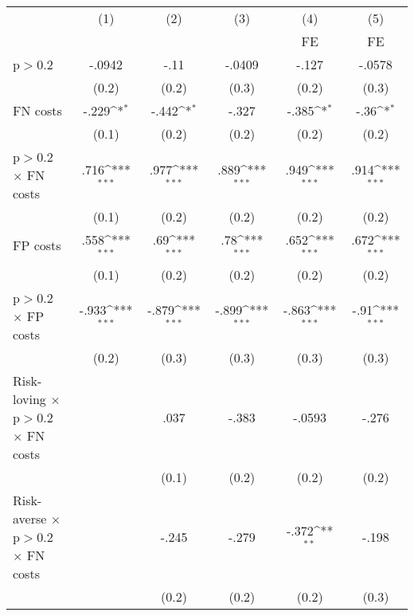 \def\sym#1{\ifmmode^{#1}\else\(^{#1}\)\fi}
\begin{tabular}{l*{5}{c}}
\hline\hline
                &\multicolumn{1}{c}{(1)}&\multicolumn{1}{c}{(2)}&\multicolumn{1}{c}{(3)}&\multicolumn{1}{c}{(4)}&\multicolumn{1}{c}{(5)}\\
                &\multicolumn{1}{c}{}&\multicolumn{1}{c}{}&\multicolumn{1}{c}{}&\multicolumn{1}{c}{FE}&\multicolumn{1}{c}{FE}\\
\hline
p$>$0.2         &   -.0942         &     -.11         &   -.0409         &    -.127         &   -.0578         \\
                &    (0.2)         &    (0.2)         &    (0.3)         &    (0.2)         &    (0.3)         \\
FN costs        &    -.229\sym{*}  &    -.442\sym{*}  &    -.327         &    -.385\sym{*}  &     -.36\sym{*}  \\
                &    (0.1)         &    (0.2)         &    (0.2)         &    (0.2)         &    (0.2)         \\
p$>$0.2 $\times$ FN costs&     .716\sym{***}&     .977\sym{***}&     .889\sym{***}&     .949\sym{***}&     .914\sym{***}\\
                &    (0.1)         &    (0.2)         &    (0.2)         &    (0.2)         &    (0.2)         \\
FP costs        &     .558\sym{***}&      .69\sym{***}&      .78\sym{***}&     .652\sym{***}&     .672\sym{***}\\
                &    (0.1)         &    (0.2)         &    (0.2)         &    (0.2)         &    (0.2)         \\
p$>$0.2 $\times$ FP costs&    -.933\sym{***}&    -.879\sym{***}&    -.899\sym{***}&    -.863\sym{***}&     -.91\sym{***}\\
                &    (0.2)         &    (0.3)         &    (0.3)         &    (0.3)         &    (0.3)         \\
Risk-loving $\times$ p$>$0.2 $\times$ FN costs&                  &     .037         &    -.383         &   -.0593         &    -.276         \\
                &                  &    (0.1)         &    (0.2)         &    (0.2)         &    (0.2)         \\
Risk-averse $\times$ p$>$0.2 $\times$ FN costs&                  &    -.245         &    -.279         &    -.372\sym{**} &    -.198         \\
                &                  &    (0.2)         &    (0.2)         &    (0.2)         &    (0.3)         \\

\end{tabular}
